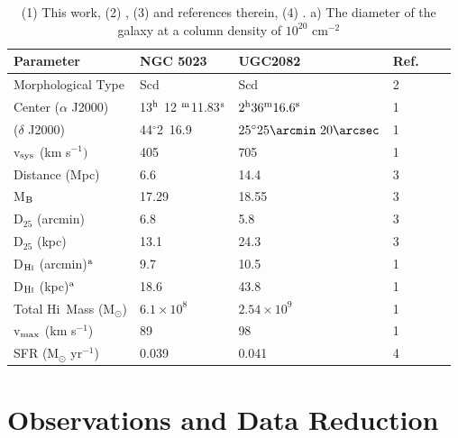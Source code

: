 \documentclass[useAMS,usenatbib]{mn2e}
\newcommand\HI{H{\sc i}}
\begin{document}
\begin{table}
    \centering
   
    \begin{tabular}{@{} llllll @{}} %
       \hline
       \hline
	Parameter& NGC 5023 & UGC2082 & Ref.\\
       \hline
       	Morphological Type &Scd  & Scd &2\\
	Center ($\alpha$ J2000)&13$^{{\rm h}}$  12 $^{{\rm m}}$11.83$^{{\rm s}}$& $2^{\rm h} 36^{\rm m} 16.6^{\rm s}$& 1\\
	 \hspace*{0.99cm}($\delta$ J2000)&44$^{\circ}$2\arcmin\ 16.9\arcsec&$25^{\circ} 25\arcmin\  20\arcsec$ & 1\\	
	v$_{\rm sys}$ (km s$^{-1})$&405& 705& 1\\              		
 	Distance (Mpc) &6.6 &14.4 & 3\\
	M$_{\rm B}$ &17.29 &18.55 & 3\\
	D$_{25}$ (arcmin)&6.8&5.8&3\\
	D$_{25}$ (kpc)&13.1&24.3& 3\\
	D$_{\rm{H \textsc{i}}}$ (arcmin)$^{\rm{a}}$&9.7&10.5 &1\\
	D$_{\rm{H \textsc{i}}}$ (kpc)$^{\rm{a}}$&18.6&43.8&1\\		
	Total \HI\ Mass (M$_{\odot}$) & $6.1 \times 10^8$ & $2.54 \times 10^9$&1\\  
	v$_{\rm max}$ (km s$^{-1}$)&89&98&1\\
	SFR (M$_{\odot}$ yr$^{-1}$) &0.039&0.041& 4\\
 \hline
    \end{tabular}
     \caption{(1) This work, (2) \citet{1992yCat.7137....0D}, (3) \citet{2011A&A...526A.118H} and references therein, (4)  \citet{2012A&A...544C...1H}.
     a) The diameter of the galaxy at a column density of $10^{20}$ cm$^{-2}$}
    \label{tab0}
 \end{table}
\section{Observations and Data Reduction}\label{Obs}
\end{document}
